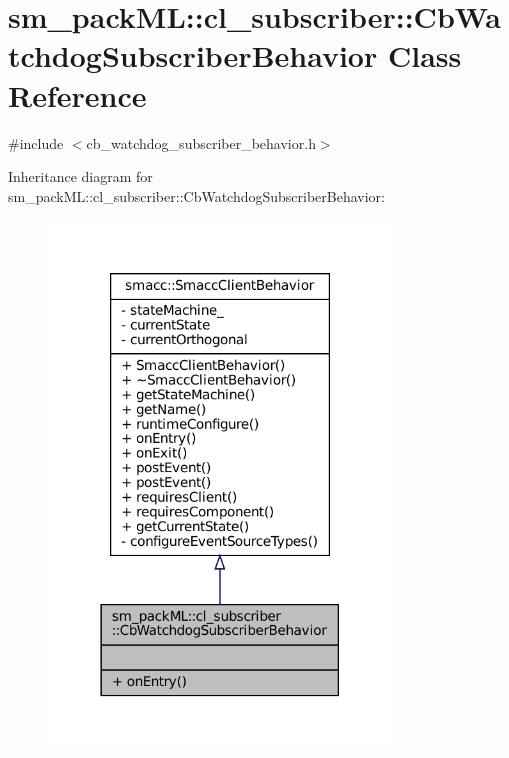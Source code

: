 \hypertarget{classsm__packML_1_1cl__subscriber_1_1CbWatchdogSubscriberBehavior}{}\section{sm\+\_\+pack\+ML\+:\+:cl\+\_\+subscriber\+:\+:Cb\+Watchdog\+Subscriber\+Behavior Class Reference}
\label{classsm__packML_1_1cl__subscriber_1_1CbWatchdogSubscriberBehavior}


{\ttfamily \#include $<$cb\+\_\+watchdog\+\_\+subscriber\+\_\+behavior.\+h$>$}



Inheritance diagram for sm\+\_\+pack\+ML\+:\+:cl\+\_\+subscriber\+:\+:Cb\+Watchdog\+Subscriber\+Behavior\+:
\nopagebreak
\begin{figure}[H]
\begin{center}
\leavevmode
\includegraphics[width=258pt]{classsm__packML_1_1cl__subscriber_1_1CbWatchdogSubscriberBehavior__inherit__graph}
\end{center}
\end{figure}


